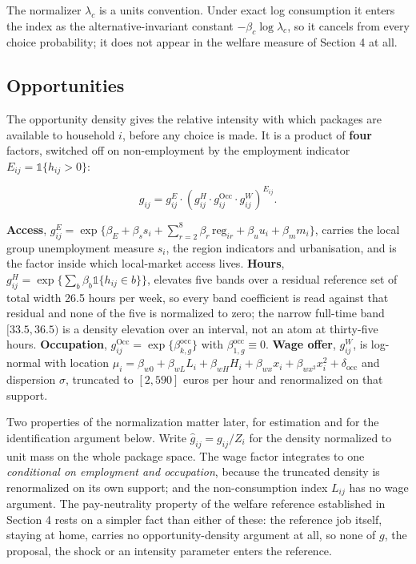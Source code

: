 \documentclass[11pt,a4paper]{article}
\begin{document}
The normalizer \(\lambda_c\) is a units convention. Under exact log consumption it enters the index as the alternative-invariant constant \(-\beta_c\log\lambda_c\), so it cancels from every choice probability; it does not appear in the welfare measure of Section 4 at all.

\subsection{Opportunities}\label{opportunities}

The opportunity density gives the relative intensity with which packages are available to household \(i\), before any choice is made. It is a product of \textbf{four} factors, switched off on non-employment by the employment indicator \(E_{ij}=\mathbb 1\{h_{ij}>0\}\):

\[
g_{ij}=g^{E}_{ij}\cdot\left(g^{H}_{ij}\cdot g^{\mathrm{Occ}}_{ij}\cdot g^{W}_{ij}\right)^{E_{ij}} .
\]

\textbf{Access}, \(g^{E}_{ij}=\exp\{\beta_E+\beta_s s_i+\sum_{r=2}^{8}\beta_r\,\mathrm{reg}_{ir}+\beta_u u_i+\beta_m m_i\}\), carries the local group unemployment measure \(s_i\), the region indicators and urbanisation, and is the factor inside which local-market access lives. \textbf{Hours}, \(g^{H}_{ij}=\exp\{\sum_b \beta_b\mathbb 1\{h_{ij}\in b\}\}\), elevates five bands over a residual reference set of total width 26.5 hours per week, so every band coefficient is read against that residual and none of the five is normalized to zero; the narrow full-time band \([33.5,36.5)\) is a density elevation over an interval, not an atom at thirty-five hours. \textbf{Occupation}, \(g^{\mathrm{Occ}}_{ij}=\exp\{\beta^{\mathrm{occ}}_{k,g}\}\) with \(\beta^{\mathrm{occ}}_{1,g}\equiv 0\). \textbf{Wage offer}, \(g^{W}_{ij}\), is log-normal with location \(\mu_i=\beta_{w0}+\beta_{wL}L_i+\beta_{wH}H_i+\beta_{wx}x_i+\beta_{wx^{2}}x_i^{2}+\delta_{\mathrm{occ}}\) and dispersion \(\sigma\), truncated to \([2,590]\) euros per hour and renormalized on that support.

Two properties of the normalization matter later, for estimation and for the identification argument below. Write \(\widehat g_{ij}=g_{ij}/Z_i\) for the density normalized to unit mass on the whole package space. The wage factor integrates to one \emph{conditional on employment and occupation}, because the truncated density is renormalized on its own support; and the non-consumption index \(L_{ij}\) has no wage argument. The pay-neutrality property of the welfare reference established in Section 4 rests on a simpler fact than either of these: the reference job itself, staying at home, carries no opportunity-density argument at all, so none of \(g\), the proposal, the shock or an intensity parameter enters the reference.
\end{document}
